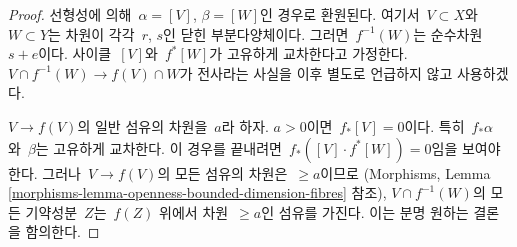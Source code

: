 \begin{proof}
선형성에 의해\  $\alpha = [V]$, $\beta = [W]$인 경우로 환원된다.
여기서\  $V \subset X$와\  $W \subset Y$는 차원이 각각\  $r$, $s$인 닫힌
부분다양체이다. 그러면\  $f^{-1}(W)$는 순수차원\  $s + e$이다.
사이클\  $[V]$와\  $f^*[W]$가 고유하게 교차한다고 가정한다.
$V \cap f^{-1}(W) \to f(V) \cap W$가 전사라는 사실을 이후 별도로
언급하지 않고 사용하겠다.

\medskip\noindent
$V \to f(V)$의 일반 섬유의 차원을\  $a$라 하자. $a > 0$이면\ 
$f_*[V] = 0$이다. 특히\  $f_*\alpha$와\  $\beta$는 고유하게 교차한다.
이 경우를 끝내려면\  $f_*([V] \cdot f^*[W]) = 0$임을 보여야 한다.
그러나\  $V \to f(V)$의 모든 섬유의 차원은\  $\geq a$이므로
(Morphisms, Lemma \ref{morphisms-lemma-openness-bounded-dimension-fibres} 참조),
$V \cap f^{-1}(W)$의 모든 기약성분\  $Z$는\  $f(Z)$ 위에서 차원\ 
$\geq a$인 섬유를 가진다. 이는 분명 원하는 결론을 함의한다.


\end{proof}
